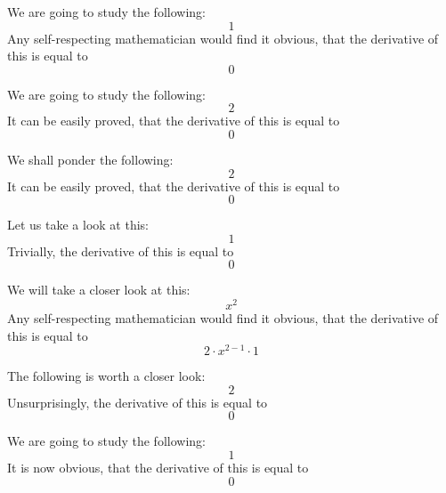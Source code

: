 \documentclass{article}
\begin{document}
We are going to study the following:
\begin{equation}
1 
\end{equation}
Any self-respecting mathematician would find it obvious, that the derivative of this is equal to
\begin{equation}
0 
\end{equation}

We are going to study the following:
\begin{equation}
2 
\end{equation}
It can be easily proved, that the derivative of this is equal to
\begin{equation}
0 
\end{equation}

We shall ponder the following:
\begin{equation}
2 
\end{equation}
It can be easily proved, that the derivative of this is equal to
\begin{equation}
0 
\end{equation}

Let us take a look at this:
\begin{equation}
1 
\end{equation}
Trivially, the derivative of this is equal to
\begin{equation}
0 
\end{equation}

We will take a closer look at this:
\begin{equation}
x ^{2 } 
\end{equation}
Any self-respecting mathematician would find it obvious, that the derivative of this is equal to
\begin{equation}
2 \cdot x ^{2 - 1 } \cdot 1 
\end{equation}

The following is worth a closer look:
\begin{equation}
2 
\end{equation}
Unsurprisingly, the derivative of this is equal to
\begin{equation}
0 
\end{equation}

We are going to study the following:
\begin{equation}
1 
\end{equation}
It is now obvious, that the derivative of this is equal to
\begin{equation}
0 
\end{equation}
\end{document}
